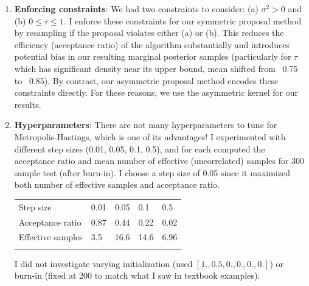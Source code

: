 \documentclass[12pt,letterpaper,twoside]{article}
\begin{document}
\begin{enumerate}[label=(\alph*)]
\item \textbf{Enforcing constraints}: We had two constraints to consider: (a) $\sigma^2 > 0$ 
and (b) $0 \le \tau \le 1$. I enforce these constraints for our symmetric proposal method by resampling 
if the proposal violates either (a) or (b). This reduces the efficiency (acceptance ratio) of 
the algorithm substantially and introduces potential bias in our resulting marginal posterior 
samples (particularly for $\tau$ which has significant density near its upper bound, mean shifted 
from ~0.75 to ~0.85). By contrast, our asymmetric proposal method encodes these constraints directly. 
For these reasons, we use the asymmetric kernel for our results.

\item \textbf{Hyperparameters}: There are not many hyperparameters to 
tune for Metropolis-Hastings, which is one of its advantages! I 
experimented with different step sizes (0.01, 0.05, 0.1, 0.5), 
and for each computed the acceptance ratio and mean number of 
effective (uncorrelated) samples for 300 sample test (after 
burn-in). I choose a step size of 0.05 since it maximized 
both number of effective samples and acceptance ratio.

\begin{table}[H]
    \centering
    \begin{tabular}{lllll}
        Step size                   & 0.01 & 0.05  & 0.1   & 0.5   \\
        Acceptance ratio            & 0.87 & 0.44  & 0.22  & 0.02  \\
        Effective samples           & 3.5  & 16.6  & 14.6  & 6.96  \\
                                    &      &       &       &         
    \end{tabular}
\end{table}

I did not investigate varying initialization (used $[1., 0.5, 0., 0., 0., 0.]$)
or burn-in (fixed at 200 to match what I saw in textbook examples).
\end{enumerate}
\end{document}
